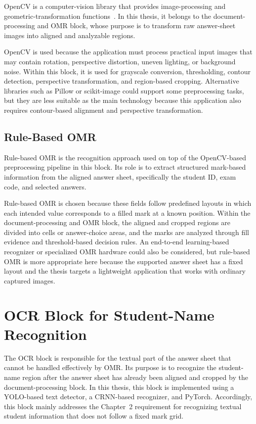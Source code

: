\documentclass[../Main.tex]{subfiles}
\begin{document}
OpenCV is a computer-vision library that provides image-processing and
geometric-transformation functions~\cite{bradski2000opencv}. In this thesis, it
belongs to the document-processing and OMR block, whose purpose is to transform
raw answer-sheet images into aligned and analyzable regions.

OpenCV is used because the application must process practical input images that
may contain rotation, perspective distortion, uneven lighting, or background
noise. Within this block, it is used for grayscale conversion, thresholding,
contour detection, perspective transformation, and region-based cropping.
Alternative libraries such as Pillow or scikit-image could support some
preprocessing tasks, but they are less suitable as the main technology because
this application also requires contour-based alignment and perspective
transformation.

\subsection{Rule-Based OMR}
\label{subsection:3.4.2}

Rule-based OMR is the recognition approach used on top of the OpenCV-based
preprocessing pipeline in this block. Its role is to extract structured
mark-based information from the aligned answer sheet, specifically the student
ID, exam code, and selected answers.

Rule-based OMR is chosen because these fields follow predefined layouts in which
each intended value corresponds to a filled mark at a known position. Within
the document-processing and OMR block, the aligned and cropped regions are
divided into cells or answer-choice areas, and the marks are analyzed through
fill evidence and threshold-based decision rules. An end-to-end learning-based
recognizer or specialized OMR hardware could also be considered, but rule-based
OMR is more appropriate here because the supported answer sheet has a fixed
layout and the thesis targets a lightweight application that works with
ordinary captured images.

\section{OCR Block for Student-Name Recognition}
\label{section:3.5}

The OCR block is responsible for the textual part of the answer sheet that
cannot be handled effectively by OMR. Its purpose is to recognize the
student-name region after the answer sheet has already been aligned and cropped
by the document-processing block. In this thesis, this block is implemented
using a YOLO-based text detector, a CRNN-based recognizer, and PyTorch.
Accordingly, this block mainly addresses the Chapter~2 requirement for recognizing textual
student information that does not follow a fixed mark grid.
\end{document}
